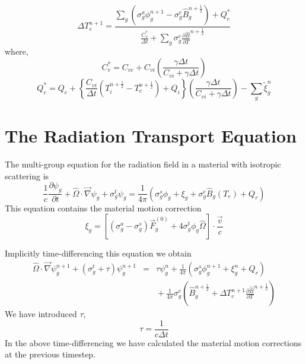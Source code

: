 \documentclass[12pt]{article}
\newcommand{\partl}[2]{\ensuremath{\frac{\partial{#1}}{\partial{#2}}}}\newcommand{\del}{\ensuremath{\vec{\nabla}}}
\newcommand{\dt}{\ensuremath{\Delta t}}
\newcommand{\cviOdt}{\ensuremath{\frac{C_{vi}}{\dt}}}
\newcommand{\Cvs}{\ensuremath{C_{v}^{*}}}
\newcommand{\cvsOdt}{\ensuremath{\frac{\Cvs}{\dt}}}
\newcommand{\Bg}{\ensuremath{\hat{B}_{g}}}
\newcommand{\Bgnphlf}{\ensuremath{\hat{B}_{g}^{n+\frac{1}{2}}}}
\newcommand{\pBgnphlfdT}{\ensuremath{\frac{\partial\hat{B}}{\partial T}^{n+\frac{1}{2}}}}
\begin{document}
\begin{equation}
   \boxed{
        \Delta T_{e}^{n+1} =
                \frac{\sum_{g} \left( \sigma_{g}^{a} \phi_{g}^{n+1} 
                         - \sigma_{g}^{e} \Bgnphlf \right)
                         + Q_{e}^{*}}
                {\cvsOdt + \sum_{g} \sigma_{g}^{e} \pBgnphlfdT}
         }
\label{eq:Tenp1}
\end{equation}
where,
\begin{equation}
        \Cvs = C_{ve} + C_{vi} \left(\frac{\gamma\dt}{C_{vi}+\gamma\dt}\right)
\end{equation}
\begin{equation}
        Q_{e}^{*} = Q_{e} + \left\{ \cviOdt (T_{i}^{n+\frac{1}{2}} - T_{e}^{n+\frac{1}{2}}) +
                                Q_{i} \right\}
                \left(\frac{\gamma\dt}{C_{vi}+\gamma\dt}\right) -
                \sum_{g} \tilde{\xi}_{g}^{n}
\end{equation}

\section{The Radiation Transport Equation}

The multi-group equation for the radiation field in a material
with isotropic scattering is
\begin{equation}
        \frac{1}{c} \partl{\psi_{g}}{t}
        + \hat{\Omega} \cdot \del \psi_{g}
        + \sigma^{t}_{g} \psi_{g}
        = \frac{1}{4 \pi}
         \left( \sigma^{s}_{g} \phi_{g}
                + \xi_{g}
                + \sigma^{e}_{g} \Bg(T_{e})
                + Q_{r}
         \right)
\label{eq:psi}
\end{equation}
This equation contains the material motion correction
\begin{equation}
        \xi_{g} = \left[ (\sigma^{a}_{g} - \sigma^{s}_{g}) \vec{F}^{(0)}_{g}
                + 4 \sigma^{t}_{g} \phi_{g} \hat{\Omega} \right]
                        \cdot \frac{\vec{v}}{c}
\label{eq:xi}
\end{equation}

Implicitly time-differencing this equation we obtain
\begin{eqnarray}
\hat{\Omega} \cdot \del \psi^{n+1}_{g} + (\sigma^{t}_{g} + \tau) \psi^{n+1}_{g}
        &=&  \tau \psi_{g}^{n}
         + \frac{1}{4\pi} \left( \sigma^{s}_{g} \phi^{n+1}_{g}
        + \xi_{g}^{n} + Q_{r} \right)
  \nonumber \\
    & & \mbox{}
        + \frac{1}{4\pi} \sigma^{e}_{g} 
                \left(\Bgnphlf + \Delta T_{e}^{n+1} \pBgnphlfdT \right)
\label{eq:RadEq1}
\end{eqnarray}
We have introduced $\tau$,
\begin{equation}
        \tau = \frac{1}{c\dt}
\end{equation}
In the above time-differencing
we have calculated the material motion corrections at the previous timestep.
\end{document}
